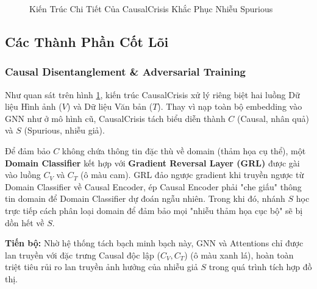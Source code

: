 \documentclass[12pt,a4paper]{article}
\begin{document}
\begin{figure}[H]
{
}
\caption{Kiến Trúc Chi Tiết Của CausalCrisis Khắc Phục Nhiễu Spurious}
\label{fig:causalcrisis}
\end{figure}

\subsection{Các Thành Phần Cốt Lõi}

\subsubsection{Causal Disentanglement \& Adversarial Training}
Như quan sát trên hình \ref{fig:causalcrisis}, kiến trúc CausalCrisis xử lý riêng biệt hai luồng Dữ liệu Hình ảnh ($V$) và Dữ liệu Văn bản ($T$). 
Thay vì nạp toàn bộ embedding vào GNN như ở mô hình cũ, CausalCrisis tách biểu diễn thành $C$ (Causal, nhân quả) và $S$ (Spurious, nhiễu giả). 

Để đảm bảo $C$ không chứa thông tin đặc thù về domain (thảm họa cụ thể), một \textbf{Domain Classifier} kết hợp với \textbf{Gradient Reversal Layer (GRL)} được gài vào luồng $C_{V}$ và $C_{T}$ (ô màu cam). GRL đảo ngược gradient khi truyền ngược từ Domain Classifier về Causal Encoder, ép Causal Encoder phải "che giấu" thông tin domain để Domain Classifier dự đoán ngẫu nhiên. Trong khi đó, nhánh $S$ học trực tiếp cách phân loại domain để đảm bảo mọi "nhiễu thảm họa cục bộ" sẽ bị dồn hết về $S$.

\textbf{Tiến bộ:} Nhờ hệ thống tách bạch minh bạch này, GNN và Attentions chỉ được lan truyền với đặc trưng Causal độc lập ($C_{V}, C_{T}$) (ô màu xanh lá), hoàn toàn triệt tiêu rủi ro lan truyền ảnh hưởng của nhiễu giả $S$ trong quá trình tích hợp đồ thị.
\end{document}
